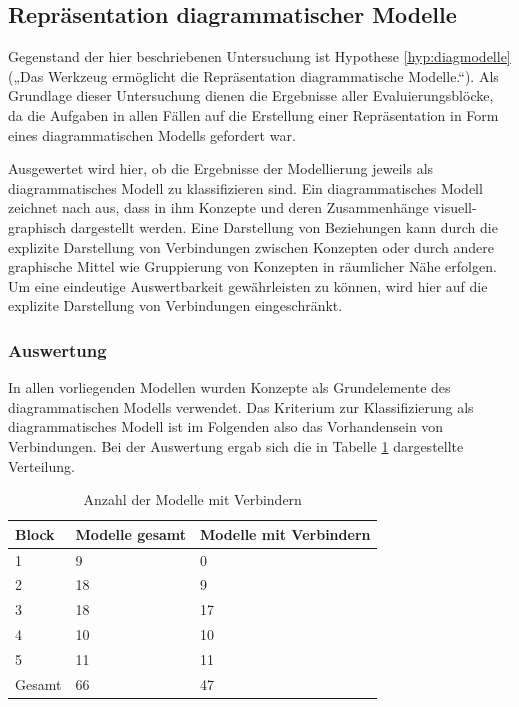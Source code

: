\subsection{Repräsentation diagrammatischer Modelle} %
\label{sub:repräsentation_diagrammatischer_modelle}

Gegenstand der hier beschriebenen Untersuchung ist Hypothese \ref{hyp:diagmodelle} („Das Werkzeug ermöglicht die Repräsentation diagrammatische Modelle.“). Als Grundlage dieser Untersuchung dienen die Ergebnisse aller Evaluierungsblöcke, da die Aufgaben in allen Fällen auf die Erstellung einer Repräsentation in Form eines diagrammatischen Modells gefordert war.

Ausgewertet wird hier, ob die Ergebnisse der Modellierung jeweils als diagrammatisches Modell zu klassifizieren sind. Ein diagrammatisches Modell zeichnet nach \citep{Larkin87} aus, dass in ihm Konzepte und deren Zusammenhänge visuell-graphisch dargestellt werden. Eine Darstellung von Beziehungen kann durch die explizite Darstellung von Verbindungen zwischen Konzepten oder durch andere graphische Mittel wie Gruppierung von Konzepten in räumlicher Nähe erfolgen. Um eine eindeutige Auswertbarkeit gewährleisten zu können, wird hier auf die explizite Darstellung von Verbindungen eingeschränkt. 

\subsubsection{Auswertung} %

In allen vorliegenden Modellen wurden Konzepte als Grundelemente des diagrammatischen Modells verwendet. Das Kriterium zur Klassifizierung als diagrammatisches Modell ist im Folgenden also das Vorhandensein von Verbindungen. Bei der Auswertung ergab sich die in Tabelle \ref{tab:modelle_mit_verbindern} dargestellte Verteilung.

\begin{table}[htbp]
	\centering
	\caption{Anzahl der Modelle mit Verbindern}

\begin{tabular}{| p{3cm} || p{3cm} | p{3cm} |}
  \hline
   Block & Modelle gesamt & Modelle mit Verbindern \\ \hline
   1 & 9 & 0 \\ 
   2 & 18 & 9 \\ 
   3 & 18 & 17 \\ 
   4 & 10 & 10 \\ 
   5 & 11 & 11 \\ \hline
   Gesamt & 66 & 47 \\ \hline
\end{tabular}
	\label{tab:modelle_mit_verbindern}
\end{table}

